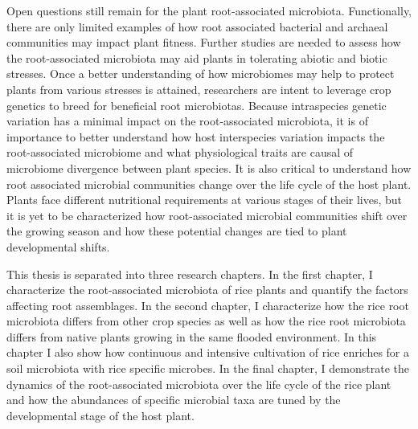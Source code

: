 Open questions still remain for the plant root-associated microbiota. Functionally, there are only limited examples of how root associated bacterial and archaeal communities may impact plant fitness. Further studies are needed to assess how the root-associated microbiota may aid plants in tolerating abiotic and biotic stresses. Once a better understanding of how microbiomes may help to protect plants from various stresses is attained, researchers are intent to leverage crop genetics to breed for beneficial root microbiotas. Because intraspecies genetic variation has a minimal impact on the root-associated microbiota, it is of importance to better understand how host interspecies variation impacts the root-associated microbiome and what physiological traits are causal of microbiome divergence between plant species. It is also critical to understand how root associated microbial communities change over the life cycle of the host plant. Plants face different nutritional requirements at various stages of their lives, but it is yet to be characterized how root-associated microbial communities shift over the growing season and how these potential changes are tied to plant developmental shifts. 

This thesis is separated into three research chapters. In the first chapter, I characterize the root-associated microbiota of rice plants and quantify the factors affecting root assemblages. In the second chapter, I characterize how the rice root microbiota differs from other crop species as well as how the rice root microbiota differs from native plants growing in the same flooded environment. In this chapter I also show how continuous and intensive cultivation of rice enriches for a soil microbiota with rice specific microbes. In the final chapter, I demonstrate the dynamics of the root-associated microbiota over the life cycle of the rice plant and how the abundances of specific microbial taxa are tuned by the developmental stage of the host plant.